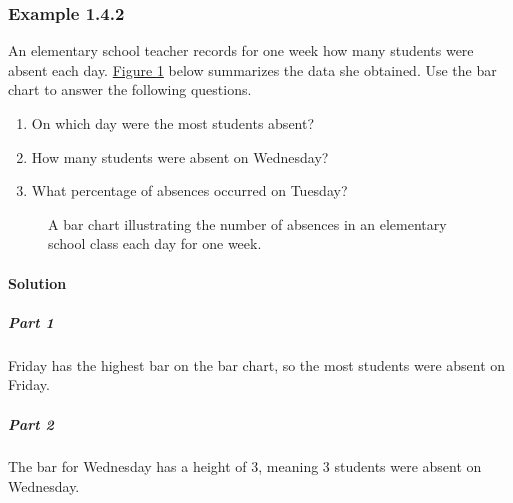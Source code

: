 \documentclass[letterpaper,10pt,english]{jupyterBook}
\begin{document}
\subsubsection{Example 1.4.2}
\label{\detokenize{Ch1 Sampling and Data/1.4 Tables and Charts:example-1-4-2}}
\sphinxAtStartPar
An elementary school teacher records for one week how many students were absent each day. \hyperref[\detokenize{Ch1 Sampling and Data/1.4 Tables and Charts:elementary-attendance-barchart}]{Figure \ref{\detokenize{Ch1 Sampling and Data/1.4 Tables and Charts:elementary-attendance-barchart}}} below summarizes the data she obtained. Use the bar chart to answer the following questions.
\begin{enumerate}
%
\item {} 
\sphinxAtStartPar
On which day were the most students absent?

\item {} 
\sphinxAtStartPar
How many students were absent on Wednesday?

\item {} 
\sphinxAtStartPar
What percentage of absences occurred on Tuesday?

\end{enumerate}

\begin{figure}[htbp]
\centering
\capstart

\noindent{}
\caption{A bar chart illustrating the number of absences in an elementary school class each day for one week.}\label{\detokenize{Ch1 Sampling and Data/1.4 Tables and Charts:elementary-attendance-barchart}}\end{figure}


\paragraph{Solution}
\label{\detokenize{Ch1 Sampling and Data/1.4 Tables and Charts:id1}}

\subparagraph{Part 1}
\label{\detokenize{Ch1 Sampling and Data/1.4 Tables and Charts:part-1}}
\sphinxAtStartPar
Friday has the highest bar on the bar chart, so the most students were absent on Friday.


\subparagraph{Part 2}
\label{\detokenize{Ch1 Sampling and Data/1.4 Tables and Charts:part-2}}
\sphinxAtStartPar
The bar for Wednesday has a height of 3, meaning 3 students were absent on Wednesday.
\end{document}
